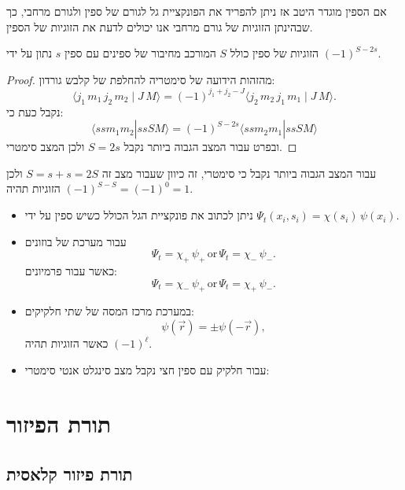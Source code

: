 \documentclass{tstextbook}
\begin{document}
\begin{proposition}
אם הספין מוגדר היטב אז ניתן להפריד את הפונקציית גל לגורם של ספין ולגורם מרחבי, כך שבהינתן הזוגיות של גורם מרחבי אנו יכולים לדעת את הזוגיות של הספין.

\end{proposition}
\begin{proposition}
הזוגיות של ספין כולל \(S\) המורכב מחיבור של ספינים עם ספין \(s\) נתון על ידי \((-1)^{S-2s}\).

\end{proposition}
\begin{proof}
מהזהות הידועה של סימטריה להחלפת של קלבש גורדון:
$$\langle j_{1}\,m_{1}\,j_{2}\,m_{2}\mid J\,M\rangle=(-1)^{j_{1}+j_{2}-J}\langle j_{2}\,m_{2}\,j_{1}\,m_{1}\mid J\,M\rangle.$$
נקבל כעת כי:
$$\langle ssm_{1}m_{2}|ssSM \rangle =(-1)^{S-2s}\langle ssm_{2}m_{1}|ssSM \rangle $$
ובפרט עבור המצב הגבוה ביותר נקבל \(S=2s\) ולכן המצב סימטרי.

\end{proof}
\begin{corollary}
עבור המצב הגבוה ביותר נקבל כי סימטרי, זה כיוון שעבור מצב זה \(S=s+s=2S\) ולכן הזוגיות תהיה \((-1)^{S-S}=(-1)^{0}=1\).

\end{corollary}
\begin{summary}
  \begin{itemize}
    \item ניתן לכתוב את פונקציית הגל הכולל כשיש ספין על ידי \(\Psi_{t}(x_{i},s_{i})=\chi(s_{i})\,\psi(x_{i})\).
    \item עבור מערכת של בוזונים $$\Psi_{t}=\chi_{+}\,\psi_{+}\,\mathrm{or}\,\Psi_{t}=\chi_{-}\,\psi_{-}.$$
כאשר עבור פרמיונים:
$$\Psi_{t}=\chi_{-}\,\psi_{+}\,\mathrm{or}\,\Psi_{t}=\chi_{+}\,\psi_{-}.$$
    \item במערכת מרכז המסה של שתי חלקיקים:
$$\psi({\vec{r}})=\pm\psi(-{\vec{r}}),$$
כאשר הזוגיות תהיה \((-1)^{\ell}\).
    \item עבור חלקיק עם ספין חצי נקבל מצב סינגלט אנטי סימטרי:
  \end{itemize}
\end{summary}
\chapter{תורת הפיזור}

\section{תורת פיזור קלאסית}
\end{document}
